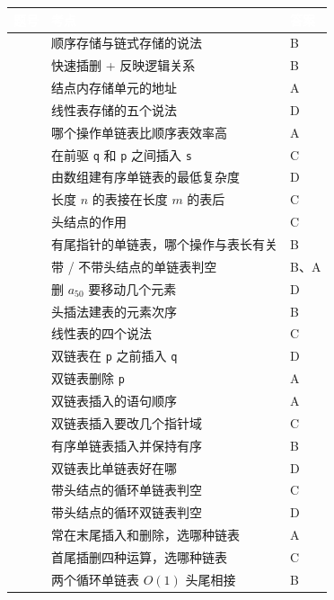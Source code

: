 \documentclass[10.5pt,a4paper,oneside]{article}
\begin{document}
{
\begin{xltabular}{\linewidth}{>{\hsize\raggedright\arraybackslash}X>{\hsize\raggedright\arraybackslash}X>{\hsize\raggedright\arraybackslash}X}
\textcolor{white}{\bfseries 题号} & \textcolor{white}{\bfseries 考点} & \textcolor{white}{\bfseries 答案} \\
 & 顺序存储与链式存储的说法 & B \\  & 快速插删 + 反映逻辑关系 & B \\  & 结点内存储单元的地址 & A \\  & 线性表存储的五个说法 & D \\  & 哪个操作单链表比顺序表效率高 & A \\  & 在前驱 \texttt{q} 和 \texttt{p} 之间插入 \texttt{s} & C \\  & 由数组建有序单链表的最低复杂度 & D \\  & 长度 \(n\) 的表接在长度 \(m\) 的表后 & C \\  & 头结点的作用 & C \\  & 有尾指针的单链表，哪个操作与表长有关 & B \\  & 带 / 不带头结点的单链表判空 & B、A \\  & 删 \(a_{50}\) 要移动几个元素 & D \\  & 头插法建表的元素次序 & B \\  & 线性表的四个说法 & C \\  & 双链表在 \texttt{p} 之前插入 \texttt{q} & D \\  & 双链表删除 \texttt{p} & A \\  & 双链表插入的语句顺序 & A \\  & 双链表插入要改几个指针域 & C \\  & 有序单链表插入并保持有序 & B \\  & 双链表比单链表好在哪 & D \\  & 带头结点的循环单链表判空 & C \\  & 带头结点的循环双链表判空 & D \\  & 常在末尾插入和删除，选哪种链表 & A \\  & 首尾插删四种运算，选哪种链表 & C \\  & 两个循环单链表 \(O(1)\) 头尾相接 & B \\ \hline

\end{xltabular}}
\end{document}
